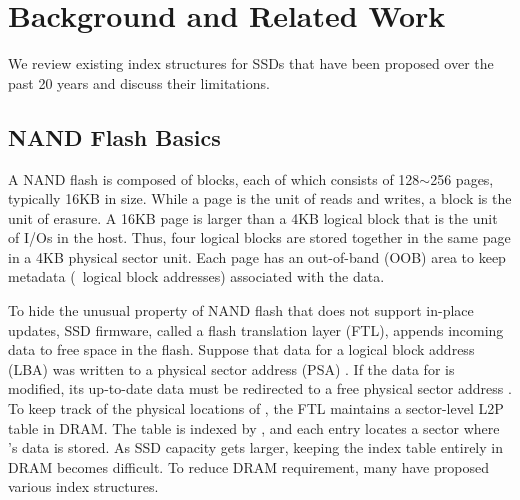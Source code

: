 \section{Background and Related Work}
\label{sec:back}

We review existing index structures for SSDs 
that have been proposed over the past 20 years and 
discuss their limitations.  

\subsection{NAND Flash Basics}
\label{sec:back:table}

A NAND flash is composed of blocks, each of which consists of 128$\sim$256
pages, typically 16KB in size.  While a page is the unit of reads and
writes, a block is the unit of erasure. A 16KB page is larger than a 4KB
logical block that is the unit of I/Os in the host. Thus, four logical blocks
are stored together in the same page in a 4KB physical sector unit.  Each page
has an out-of-band (OOB) area to keep metadata (\ie~logical block
addresses) associated with the data. 

To hide the unusual property of NAND flash that does not support in-place
updates, SSD firmware, called a flash translation layer (FTL), 
appends incoming
data to free space in the flash.  
Suppose that data for a logical block address
(LBA)  was written to a physical sector address (PSA) .
If the data for  is modified, its up-to-date data must be
redirected to a free physical sector address .  To keep track of the
physical locations of , 
the FTL maintains a sector-level L2P table in DRAM. 
The table is indexed by , 
and each entry locates a sector  where
's data is stored.
As SSD capacity gets larger, keeping the index table entirely in DRAM becomes
difficult.  To reduce DRAM requirement, many have proposed various index
structures.

